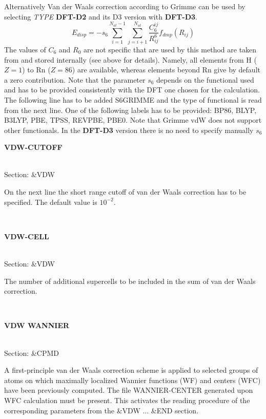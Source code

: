 \documentclass[twoside,10pt,titlepage,a4paper]{article}
\newcommand{\reflabel}[1]{\hypertarget{#1}}
\newcommand{\reflabel}[1]{\label{#1}}
\newcommand{\keyword}[5]{%
\vspace{1.0cm}
\begin{minipage}{15cm}
\reflabel{#1}{\textbf{\large #1}}%
\index{#1}%
\ \textbf{#2}%
\ \textbf{#3}%
\ \textit{#4}%
     \hfill\\\smallskip
     {Section: #5}
     \hfill\\\smallskip\vskip 10pt
\end{minipage}
}%
\newcommand{\desc}[1]{%
   \hspace*{\fill} \parbox{130mm}{\sloppy
                          {#1}%
                             }
     \hfill\\\smallskip
   }%
\newcommand{\desc}[1]{#1\vspace{1ex}}
\begin{document}
{Alternatively Van der Waals correction according to Grimme can be used \cite{Grimme06}
by selecting {\itshape TYPE} {\bf DFT-D2} and its D3 version \cite{GrimmeD3} with {\bf DFT-D3}. 
 \begin{equation}
  E_{disp} = - s_6 \sum_{i=1}^{N_{at} -1} \sum_{j=i+1}^{N_{at}} 
               \frac{C_6^{ij}}{R_{ij}^6} f_{dmp} (R_{ij})
 \end{equation}       
The values of $C_6$ and $R_0$ are not specific that are used by this method are taken 
from \cite{Grimme06} 
and stored internally (see above for details). Namely, all elements from H ($Z=1$) to
Rn ($Z=86$) are available, whereas elements beyond Rn give by default a zero contribution.
Note that the parameter $s_6$ depends on the functional used and has to be provided consistently
with the DFT one chosen for the calculation. The following line has to be added {S6GRIMME}
and the type of functional is read from the next line. One of the following labels has to be provided:
{BP86, BLYP, B3LYP, PBE, TPSS, REVPBE, PBE0}. Note that Grimme vdW does not support other functionals.
In the {\bf DFT-D3} version \cite{GrimmeD3} there is no need to specify manually $s_6$
}


\keyword{VDW-CUTOFF}{}{}{}{\&VDW}
   \desc{On the next line the short range cutoff of van der Waals correction
    has to be specified. The default value is $10^{-2}$.}

\keyword{VDW-CELL}{}{}{}{\&VDW}
   \desc{The number of additional supercells to be included in the sum of
    van der Waals correction.}

\keyword{VDW WANNIER}{}{}{}{\&CPMD}
\desc{A first-principle van der Waals correction scheme \cite{psil1,psil2,psil3}
  is applied to selected groups of atoms on which maximally localized Wannier
  functions (WF) and centers (WFC) have been previously computed.
  The file WANNIER-CENTER generated upon WFC calculation must be present.
  This activates the reading procedure of the corresponding parameters from
  the \&VDW ... \&END section.}
\end{document}
